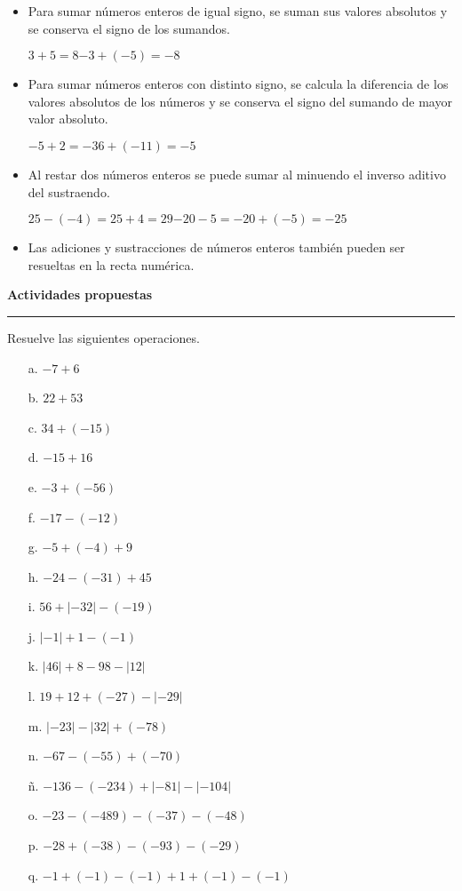 \documentclass[spanish,letterpaper, 11pt, addpoints, answers]{exam}
\begin{document}
\begin{questions}
  \begin{itemize}
    \item Para sumar números enteros de igual signo, se suman sus valores absolutos y se conserva el signo de los sumandos.
    \begin{center}
      $3+5=8$\hspace{2cm}$-3+(-5)=-8$
    \end{center}
    \item Para sumar números enteros con distinto signo, se calcula la diferencia de los valores absolutos de los números y se conserva el signo del sumando de mayor valor absoluto.
    \begin{center}
      $-5+2=-3$\hspace{2cm}$6+(-11)=-5$
    \end{center}
    \item Al restar dos números enteros se puede sumar al minuendo el inverso aditivo del sustraendo.
    \begin{center}
      $25-(-4)=25+4=29$\hspace{2cm}$-20-5=-20+(-5)=-25$
    \end{center}
    \item Las adiciones y sustracciones de números enteros también pueden ser resueltas en la recta numérica.
    
  \end{itemize}
  
  \parbox{6in}{
  \textbf{Actividades propuestas}}
  \vspace{0.15in}
  \hrule 


\question Resuelve las siguientes operaciones.

\begin{multicols}{2}
  


\begin{itemize}
  \item[a.] $-7+6$
  \item[b.] $22+53$
  \item[c.] $34+(-15)$
  \item[d.] $-15+16$
  \item[e.] $-3+(-56)$
  \item[f.] $-17-(-12)$
  \item[g.] $-5+(-4)+9$
  \item[h.] $-24-(-31)+45$
  \item[i.] $56+|-32|-(-19)$
  \item[j.] $|-1|+1-(-1)$
  \item[k.] $|46|+8-98-|12|$
  \item[l.] $19+12+(-27)-|-29|$
  \item[m.] $|-23|-|32|+(-78)$
  \item[n.] $-67-(-55)+(-70)$
  \item[ñ.] $-136-(-234)+|-81|-|-104|$
  \item[o.] $-23-(-489)-(-37)-(-48)$
  \item[p.] $-28+(-38)-(-93)-(-29)$
  \item[q.] $-1+(-1)-(-1)+1+(-1)-(-1)$             
\end{itemize}


\end{multicols}
\end{questions}
\end{document}
